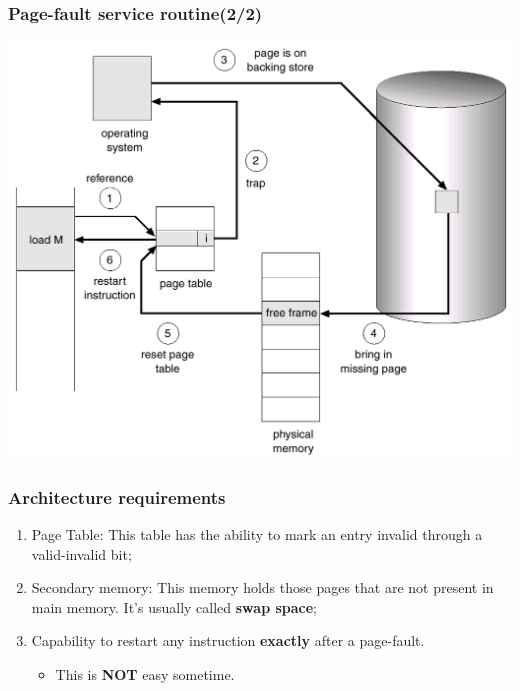 \documentclass[CJKutf8,xcolor=pdftex,dvipsnames,table]{beamer}
\begin{document}
\begin{CJK*}{UTF8}{song}
  \begin{frame}
    \frametitle{Page-fault service routine(2/2)} \pause
    \begin{center}
      \includegraphics[scale=.3]{v6f10-4}
    \end{center}
  \end{frame}
  
  \begin{frame}
    \frametitle{Architecture requirements} \pause
    \begin{enumerate}
    \item{Page Table: This table has the ability to mark an entry invalid through a valid-invalid bit;} \pause
    \item{Secondary memory: This memory holds those pages that are not present in main memory. It's usually called \textbf{swap space};} \pause
    \item{Capability to restart any instruction \textbf{exactly} after a page-fault.} \pause
      \begin{itemize}
      \item{This is \textbf{NOT} easy sometime.}
      \end{itemize}
    \end{enumerate}
  \end{frame}
  

\end{CJK*}
\end{document}
